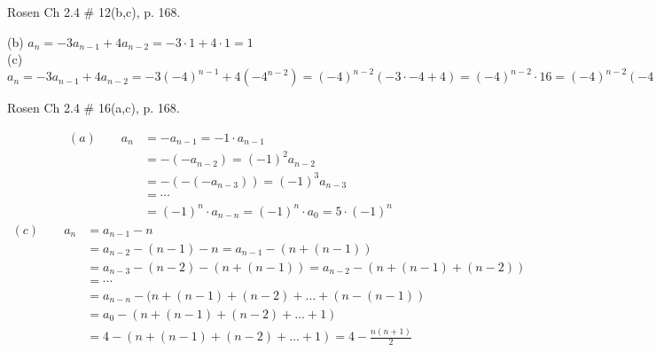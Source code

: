 \documentclass[11pt,addpoints]{exam}
\begin{document}
\begin{questions}
\question[4] Rosen Ch 2.4 \# 12(b,c), p. 168.
    \ifprintanswers
        \vspace{-10pt}
   \fi
\begin{solution}
 (b) $a_n = -3a_{n-1} + 4a_{n-2} = -3\cdot 1 + 4 \cdot 1 = 1$ \\
 (c) $a_n = -3a_{n-1} + 4a_{n-2} = -3(-4)^{n-1} + 4(-4^{n-2}) = (-4)^{n-2}(-3\cdot -4 + 4) = (-4)^{n-2}\cdot 16 = (-4)^{n-2}(-4)^2 = -4^{n}$
\end{solution}


\question[16] Rosen Ch 2.4 \# 16(a,c), p. 168.
    \ifprintanswers
        \vspace{-10pt}
   \fi
\begin{solution}
		\small \vspace{-0.2in}
    	\begin{align*}
	        (a) \quad \quad a_n &= -a_{n-1} = -1\cdot a_{n-1} \\
	          &= -(-a_{n-2}) = (-1)^2a_{n-2} \\
	          &= -(-(-a_{n-3})) = (-1)^3a_{n-3} \\
	          &= \cdots \\
	          &= (-1)^n\cdot a_{n-n} = (-1)^n\cdot a_{0} = 5\cdot(-1)^n
    	\end{align*}
        \vspace{-0.1in} 
        \begin{align*}
            (c) \quad \quad a_n &= a_{n-1} - n \\
            &= a_{n-2} -(n-1) - n = a_{n-1} - (n + (n-1)) \\
            &= a_{n-3} -(n-2) - (n + (n-1)) = a_{n-2} - (n + (n-1) + (n-2)) \\
            &= \cdots \\
            &= a_{n-n} -(n + (n-1) + (n-2) + \ldots + (n- (n-1)) \\
            &= a_0 - (n + (n-1) + (n-2) + \ldots + 1) \\
            &= 4 - (n + (n-1) + (n-2) + \ldots + 1) = 4 -\frac{n(n+1)}{2}
        \end{align*}
\end{solution}



\end{questions}
\end{document}
